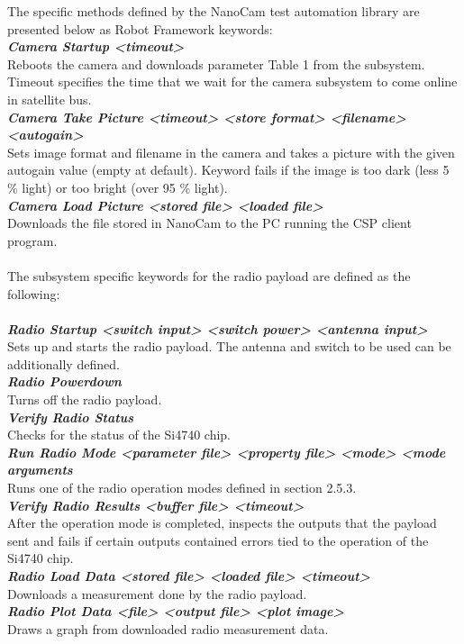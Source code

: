 \documentclass[english,12pt,a4paper,pdftex,elec,utf8]{aaltothesis}
\begin{document}
The specific methods defined by the NanoCam test automation library are presented below as Robot Framework keywords:\\
\textit{\textbf{Camera Startup	<timeout>}}\\
Reboots the camera and downloads parameter Table 1 from the subsystem. Timeout specifies the time that we wait for the camera subsystem to come online in satellite bus.\\
\textit{\textbf{Camera Take Picture	<timeout> <store format> <filename> <autogain>}}\\
Sets image format and filename in the camera and takes a picture with the given autogain value (empty at default). Keyword fails if the image is too dark (less 5 \% light) or too bright (over 95 \% light).\\
\textit{\textbf{Camera Load Picture	<stored file> <loaded file>}}\\
Downloads the file stored in NanoCam to the PC running the CSP client program.\\
\\
The subsystem specific keywords for the radio payload are defined as the following:\\
\\
\textit{\textbf{Radio Startup  <switch input> <switch power> <antenna input>}}\\
Sets up and starts the radio payload. The antenna and switch to be used can be additionally defined.\\
\textit{\textbf{Radio Powerdown}}\\
Turns off the radio payload.\\
\textit{\textbf{Verify Radio Status}}\\
Checks for the status of the Si4740 chip.\\
\textit{\textbf{Run Radio Mode  <parameter file> <property file> <mode> <mode arguments}}\\
Runs one of the radio operation modes defined in section 2.5.3.\\
\textit{\textbf{Verify Radio Results  <buffer file> <timeout>}}\\
After the operation mode is completed, inspects the outputs that the payload sent and fails if certain outputs contained errors tied to the operation of the Si4740 chip. \\
\textit{\textbf{Radio Load Data  <stored file> <loaded file> <timeout>}}\\
Downloads a measurement done by the radio payload.\\
\textit{\textbf{Radio Plot Data  <file> <output file> <plot image>}}\\
Draws a graph from downloaded radio measurement data.\\
  
\end{document}
